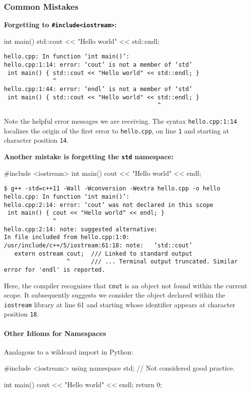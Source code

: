 \documentclass[12pt,letterpaper,twoside]{article}
\begin{document}
\vspace{-2ex}
\subsubsection{Common Mistakes}
\textbf{Forgetting to \texttt{\#include\textless{}iostream\textgreater{}}:}
\begin{cpp}
int main() { std::cout << "Hello world" << std::endl; }
\end{cpp}

{\footnotesize
\begin{verbatim}
hello.cpp: In function ‘int main()’:
hello.cpp:1:14: error: ‘cout’ is not a member of ‘std’
 int main() { std::cout << "Hello world" << std::endl; }
              ^
hello.cpp:1:44: error: ‘endl’ is not a member of ‘std’
 int main() { std::cout << "Hello world" << std::endl; }
                                            ^
\end{verbatim}
}
Note the helpful error messages we are receiving. The syntax
\texttt{hello.cpp:1:14} localizes the origin of the first error to
\texttt{hello.cpp}, on line \texttt{1} and starting at character
position \texttt{14}.

\textbf{Another mistake is forgetting the \texttt{std} namespace:}
\begin{cpp}
#include <iostream>
int main() { cout << "Hello world" << endl; }
\end{cpp}

{\footnotesize
\begin{verbatim}
$ g++ -std=c++11 -Wall -Wconversion -Wextra hello.cpp -o hello
hello.cpp: In function ‘int main()’:
hello.cpp:2:14: error: ‘cout’ was not declared in this scope
 int main() { cout << "Hello world" << endl; }
              ^
hello.cpp:2:14: note: suggested alternative:
In file included from hello.cpp:1:0:
/usr/include/c++/5/iostream:61:18: note:   ‘std::cout’
   extern ostream cout;  /// Linked to standard output
                  ^      /// ... Terminal output truncated. Similar error for 'endl' is reported.
\end{verbatim}
}
Here, the compiler recognizes that \texttt{cout} is an object not
found within the current scope. It subsequently suggests we consider
the object declared within the \texttt{iostream} library at line 61
and starting whose identifier appears at character position \texttt{18}.

\paragraph{Other Idioms for Namespaces}
Analagous to a wildcard import in Python:
\begin{cpp}
#include <iostream>
using namespace std;   // Not considered good practice.

int main() {
  cout << "Hello world" << endl;
  return 0;
}
\end{cpp}
\end{document}
